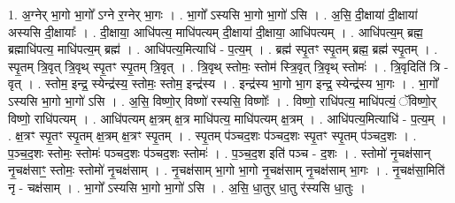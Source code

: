 \documentclass[17pt]{extarticle}
\begin{document}
1. अ॒ग्नेर् भा॒गो भा॒गो᳚ ऽग्ने र॒ग्नेर् भा॒गः । . भा॒गो᳚ ऽस्यसि भा॒गो भा॒गो॑ ऽसि । . अ॒सि॒ दी॒क्षाया॑ दी॒क्षाया॑ अस्यसि दी॒क्षायाः᳚ । . दी॒क्षाया॒ आधि॑पत्य॒ माधि॑पत्यम् दी॒क्षाया॑ दी॒क्षाया॒ आधि॑पत्यम् । . आधि॑पत्य॒म् ब्रह्म॒ ब्रह्माधि॑पत्य॒ माधि॑पत्य॒म् ब्रह्म॑ । . आधि॑पत्य॒मित्याधि॑ - प॒त्य॒म् । . ब्रह्म॑ स्पृ॒तꣳ स्पृ॒तम् ब्रह्म॒ ब्रह्म॑ स्पृ॒तम् । . स्पृ॒तम् त्रि॒वृत् त्रि॒वृथ् स्पृ॒तꣳ स्पृ॒तम् त्रि॒वृत् । . त्रि॒वृथ् स्तोमः॒ स्तोम॑ स्त्रि॒वृत् त्रि॒वृथ् स्तोमः॑ । . त्रि॒वृदिति॑ त्रि - वृत् । . स्तोम॒ इन्द्र॒ स्येन्द्र॑स्य॒ स्तोमः॒ स्तोम॒ इन्द्र॑स्य । . इन्द्र॑स्य भा॒गो भा॒ग इन्द्र॒ स्येन्द्र॑स्य भा॒गः । . भा॒गो᳚ ऽस्यसि भा॒गो भा॒गो॑ ऽसि । . अ॒सि॒ विष्णो॒र् विष्णो॑ रस्यसि॒ विष्णोः᳚ । . विष्णो॒ राधि॑पत्य॒ माधि॑पत्यं॒ ॅविष्णो॒र् विष्णो॒ राधि॑पत्यम् । . आधि॑पत्यम् क्ष॒त्रम् क्ष॒त्र माधि॑पत्य॒ माधि॑पत्यम् क्ष॒त्रम् । . आधि॑पत्य॒मित्याधि॑ - प॒त्य॒म् । . क्ष॒त्रꣳ स्पृ॒तꣳ स्पृ॒तम् क्ष॒त्रम् क्ष॒त्रꣳ स्पृ॒तम् । . स्पृ॒तम् प॑ञ्चद॒शः प॑ञ्चद॒शः स्पृ॒तꣳ स्पृ॒तम् प॑ञ्चद॒शः । . प॒ञ्च॒द॒शः स्तोमः॒ स्तोमः॑ पञ्चद॒शः प॑ञ्चद॒शः स्तोमः॑ । . प॒ञ्च॒द॒श इति॑ पञ्च - द॒शः । . स्तोमो॑ नृ॒चक्ष॑सान् नृ॒चक्ष॑साꣳ॒॒ स्तोमः॒ स्तोमो॑ नृ॒चक्ष॑साम् । . नृ॒चक्ष॑साम् भा॒गो भा॒गो नृ॒चक्ष॑साम् नृ॒चक्ष॑साम् भा॒गः । . नृ॒चक्ष॑सा॒मिति॑ नृ - चक्ष॑साम् । . भा॒गो᳚ ऽस्यसि भा॒गो भा॒गो॑ ऽसि । . अ॒सि॒ धा॒तुर् धा॒तु र॑स्यसि धा॒तुः । \newline
\end{document}

